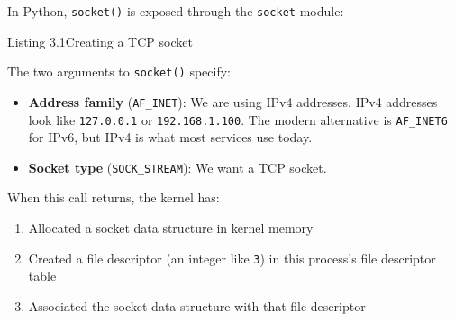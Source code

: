In Python, \texttt{socket()} is exposed through the \texttt{socket} module:

\begin{codeboxcap}[short]{\textcolor{accent}{Listing 3.1}\enspace Creating a TCP socket}

\begin{Shaded}
\begin{Highlighting}[]

\OperatorTok{=}

\NormalTok{(}\SpecialCharTok{\{}\SpecialCharTok{\}}\NormalTok{)}
\end{Highlighting}
\end{Shaded}

\end{codeboxcap}

\noindent{}The two arguments to \texttt{socket()} specify:

\begin{itemize}
\tightlist
\item
  \textbf{Address family} (\texttt{AF\_INET}): We are using IPv4 addresses. IPv4 addresses look like \texttt{127.0.0.1} or \texttt{192.168.1.100}. The modern alternative is \texttt{AF\_INET6} for IPv6, but IPv4 is what most services use today.
\item
  \textbf{Socket type} (\texttt{SOCK\_STREAM}): We want a TCP socket.
\end{itemize}

\noindent{}When this call returns, the kernel has:

\begin{enumerate}
\def\labelenumi{\arabic{enumi}.}
\tightlist
\item
  Allocated a socket data structure in kernel memory
\item
  Created a file descriptor (an integer like \texttt{3}) in this process's file descriptor table
\item
  Associated the socket data structure with that file descriptor
\end{enumerate}

